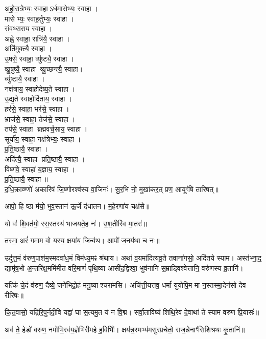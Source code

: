 अ॒हो॒रा॒त्रेभ्यः॒ स्वाहाऽर्धमा॒सेभ्यः॒ स्वाहा।\\
मासेभ्यः॒ स्वाह॒र्तुभ्यः॒ स्वाहा।\\
सं॒व॒थ्स॒राय॒ स्वाहा।\\
अह्ने॒ स्वाहा॒ रात्रि॑यै॒ स्वाहा।\\
अति॑मुक्त्यै॒ स्वाहा।\\
उ॒षसे॒ स्वाहा॒ व्यु॑ष्ट्यै॒ स्वाहा।\\
व्यू॒षुष्यै॒ स्वाहा व्यु॒च्छन्त्यै॒ स्वाहा।\\
व्यु॑ष्टायै॒ स्वाहा।\\
नक्ष॑त्राय॒ स्वाहो॑देष्य॒ते स्वाहा।\\
उ॒द्य॒ते स्वाहोदि॑ताय॒ स्वाहा।\\
हर॑से॒ स्वाहा॒ भर॑से॒ स्वाहा।\\
भ्राज॑से॒ स्वाहा॒ तेज॑से॒ स्वाहा।\\
तप॑से॒ स्वाहा ब्रह्मवर्च॒साय॒ स्वाहा।\\
सूर्या॑य॒ स्वाहा॒ नक्ष॑त्रेभ्यः॒ स्वाहा।\\
प्र॒ति॒ष्ठायै॒ स्वाहा।\\
अदि॑त्यै॒ स्वाहा प्रति॒ष्ठायै॒ स्वाहा।\\
विष्ण॑वे॒ स्वाहा॑ य॒ज्ञाय॒ स्वाहा।\\
प्र॒ति॒ष्ठायै॒ स्वाहा॥\\

द॒धि॒क्राव्ण्णो॑ अकारिषं जि॒ष्णोरश्व॑स्य वा॒जिनः॑।
सु॒र॒भि नो॒ मुखा॑कर॒त् प्रण॒ आयूꣳ॑षि तारिषत्॥

आपो॒ हि ष्ठा म॑यो॒ भुव॒स्तान॑ ऊ॒र्जे द॑धातन। म॒हेरणा॑य चक्ष॑से॥

यो वः॑ शि॒वत॑मो॒ रस॒स्तस्य॑ भाजयते॒ह नः॑। उ॒श॒तीरि॑व मा॒तरः॑॥

तस्मा॒ अरं॑ गमाम वो॒ यस्य॒ क्षया॑य॒ जिन्व॑थ। आपो॑ ज॒नय॑था च नः॥

उदु॑त्त॒मं व॑रुण॒पाश॑म॒स्मदवा॑ध॒मं विम॑ध्य॒मꣴ श्र॑थाय।
अथा॑ व॒यमा॑दित्यव्र॒ते तवाना॑गसो॒ अदि॑तये स्याम।
अस्त॑भ्ना॒द्॒ द्यामृ॑ष॒भो अ॒न्तरि॑क्ष॒ममि॑मीत वरि॒माणं॑ पृथि॒व्या
आसी॑द॒द्विश्वा॒ भुव॑नानि स॒म्राड्विश्वेत्तानि॒ वरु॑णस्य व्र॒तानि॑।

यत्किं चे॒दं व॑रुण॒ दैव्ये॒ जने॑भिद्रो॒हं मनु॒ष्याश्चरा॑मसि। 
अचि॑त्ती॒यत्तव॒ धर्मा॑ युयोपि॒म मा न॒स्तस्मा॒देन॑सो देव रीरिषः॥

कि॒त॒वासो॒ यद्रि॑रि॒पुर्नदी॒वि यद्वा॑ घा स॒त्यमु॒त यं न वि॒द्म। 
सर्वा॒ताविष्य॑ शिथि॒रेव॑ दे॒वाथा॑ ते स्याम वरुण प्रि॒यासः॑॥

अव॑ ते॒ हेडो॑ वरुण॒ नमो॑भि॒रव॑य॒ज्ञेभि॑रीमहे ह॒विर्भिः॑।
क्षय॑न्न॒स्मभ्य॑मसुरप्रचेतो॒ राज॒न्नेनाꣳ॑सिशिश्रथः कृ॒तानि॑॥

